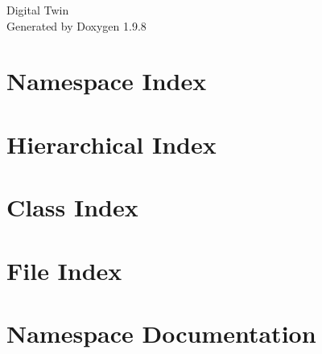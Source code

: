 \documentclass[twoside]{book}
\newcommand{\+}{\discretionary{\mbox{\scriptsize$\hookleftarrow$}}{}{}}
\newcommand{\clearemptydoublepage}{%
    \newpage{\pagestyle{empty}\cleardoublepage}%
  }
\begin{document}
  \raggedbottom
    \hypersetup{pageanchor=false,
                bookmarksnumbered=true,
                pdfencoding=unicode
               }
  \begin{titlepage}
  \vspace*{7cm}
  \begin{center}%
  {\Large Digital Twin}\\
  \vspace*{1cm}
  {\large Generated by Doxygen 1.9.8}\\
  \end{center}
  \end{titlepage}
  \clearemptydoublepage
  \tableofcontents
  \clearemptydoublepage
  \hypersetup{pageanchor=true}



\chapter{Namespace Index}

\chapter{Hierarchical Index}

\chapter{Class Index}

\chapter{File Index}

\chapter{Namespace Documentation}







\end{document}
